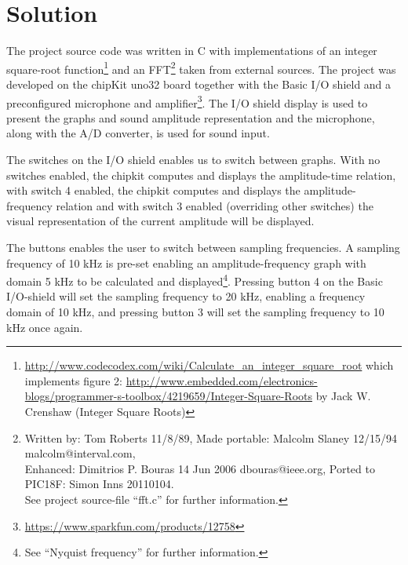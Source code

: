 \documentclass[a4paper,11pt]{article}
\begin{document}
\section*{Solution}
The project source code was written in C with implementations of an integer square-root function\footnote{\url{http://www.codecodex.com/wiki/Calculate_an_integer_square_root} which implements figure 2: \url{http://www.embedded.com/electronics-blogs/programmer-s-toolbox/4219659/Integer-Square-Roots} by Jack W. Crenshaw (Integer Square Roots)} 
and an FFT\footnote{Written by:  Tom Roberts  11/8/89, Made portable:  Malcolm Slaney 12/15/94 malcolm@interval.com, \\Enhanced:  Dimitrios P. Bouras  14 Jun 2006 dbouras@ieee.org, Ported to PIC18F:  Simon Inns 20110104.\\ See project source-file ``fft.c'' for further information.} 
taken from external sources. The project was developed on the chipKit uno32 board together with the Basic I/O shield and a preconfigured microphone and amplifier\footnote{\url{https://www.sparkfun.com/products/12758}}. The I/O shield display is used to present the graphs and sound amplitude representation and the microphone, along with the A/D converter, is used for sound input. 

The switches on the I/O shield enables us to switch between graphs. With no switches enabled, the chipkit computes and displays the amplitude-time relation, with switch 4 enabled, the chipkit computes and displays the amplitude-frequency relation and with switch 3 enabled (overriding other switches) the visual representation of the current amplitude will be displayed.

The buttons enables the user to switch between sampling frequencies. A sampling frequency of 10 kHz is pre-set enabling an amplitude-frequency graph with domain 5 kHz to be calculated and displayed\footnote{See ``Nyquist frequency'' for further information.}. Pressing button 4 on the Basic I/O-shield will set the sampling frequency to 20 kHz, enabling a frequency domain of 10 kHz, and pressing button 3 will set the sampling frequency to 10 kHz once again.
\end{document}
